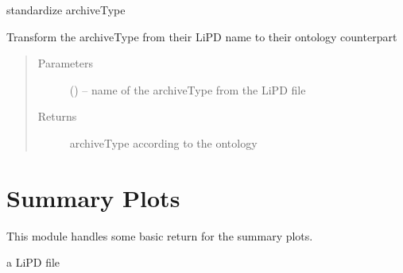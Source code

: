 \documentclass[letterpaper,10pt,english]{sphinxmanual}
\begin{document}
\begin{fulllineitems}
\label{\detokenize{LipdUtils:pyleoclim.LipdUtils.LipdToOntology}}
standardize archiveType

Transform the archiveType from their LiPD name to their ontology counterpart
\begin{quote}\begin{description}
\item[{Parameters}] \leavevmode
{} () -- name of the archiveType from the LiPD file

\item[{Returns}] \leavevmode
archiveType according to the ontology

\end{description}\end{quote}

\end{fulllineitems}



\chapter{Summary Plots}
\label{\detokenize{SummaryPlots::doc}}\label{\detokenize{SummaryPlots:summary-plots}}
This module handles some basic return for the summary plots.

 a LiPD file
\end{document}
